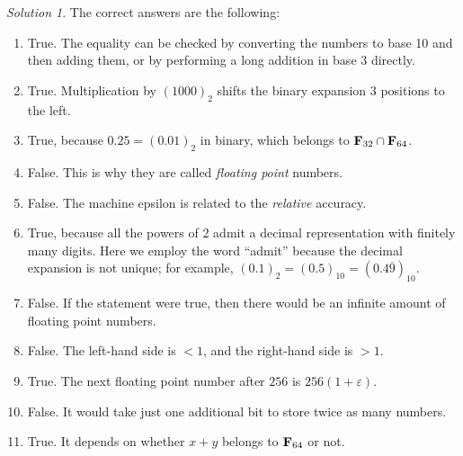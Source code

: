 \documentclass[11pt]{article}
\theoremstyle{definition}
\theoremstyle{remark}
\newtheorem*{solution}{Solution}
\begin{document}
\begin{solution}
    The correct answers are the following:
    \begin{enumerate}
        \item
            True.
            The equality can be checked by converting the numbers to base 10 and then adding them,
            or by performing a long addition in base 3 directly.

        \item
            True.
            Multiplication by $(1000)_2$ shifts the binary expansion 3 positions to the left.

        \item
            True, because $0.25 = (0.01)_2$ in binary,
            which belongs to $\mathbf F_{32} \cap \mathbf F_{64}$.

        \item
            False. This is why they are called \emph{floating point} numbers.

        \item
            False. The machine epsilon is related to the \emph{relative} accuracy.

        \item
            True, because all the powers of 2 admit a decimal representation with finitely many digits.
            Here we employ the word ``admit'' because the decimal expansion is not unique;
            for example, $(0.1)_2 = (0.5)_10 = (0.4\overline{9})_10$.

        \item
            False. If the statement were true,
            then there would be an infinite amount of floating point numbers.

        \item
            False. The left-hand side is $< 1$, and the right-hand side is $> 1$.


        \item
            True. The next floating point number after $256$ is $256 (1 + \varepsilon)$.

        \item
            False. It would take just one additional bit to store twice as many numbers.

        \item
            True. It depends on whether $x + y$ belongs to $\mathbf F_{64}$ or not.
    \end{enumerate}
\end{solution}
\end{document}
